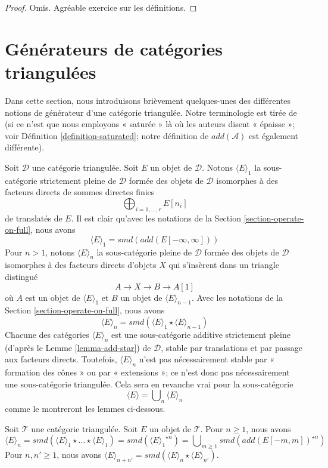 \begin{proof}
Omis. Agréable exercice sur les définitions.
\end{proof}

\section{Générateurs de catégories triangulées}
\label{section-generators}

\noindent
Dans cette section, nous introduisons brièvement quelques-unes des différentes
notions de générateur d'une catégorie triangulée. Notre terminologie est tirée
de \cite{BvdB} (si ce n'est que nous employons « saturée » là où les auteurs
disent « épaisse »; voir Définition \ref{definition-saturated}; notre définition
de $add(\mathcal{A})$ est également différente).

\medskip\noindent
Soit $\mathcal{D}$ une catégorie triangulée. Soit $E$ un objet de
$\mathcal{D}$. Notons $\langle E \rangle_1$ la sous-catégorie strictement
pleine de $\mathcal{D}$ formée des objets de $\mathcal{D}$ isomorphes à des
facteurs directs de sommes directes finies
$$
\bigoplus\nolimits_{i = 1, \ldots, r} E[n_i]
$$
de translatés de $E$. Il est clair qu'avec les notations de la
Section \ref{section-operate-on-full}, nous avons
$$
\langle E \rangle_1 = smd(add(E[-\infty, \infty]))
$$
Pour $n > 1$, notons $\langle E \rangle_n$ la sous-catégorie pleine de
$\mathcal{D}$ formée des objets de $\mathcal{D}$ isomorphes à des facteurs
directs d'objets $X$ qui s'insèrent dans un triangle distingué
$$
A \to X \to B \to A[1]
$$
où $A$ est un objet de $\langle E \rangle_1$ et $B$ un objet de
$\langle E \rangle_{n - 1}$. Avec les notations de la
Section \ref{section-operate-on-full}, nous avons
$$
\langle E \rangle_n = smd(\langle E \rangle_1 \star \langle E \rangle_{n - 1})
$$
Chacune des catégories $\langle E \rangle_n$ est une sous-catégorie additive
strictement pleine (d'après le Lemme \ref{lemma-add-star}) de $\mathcal{D}$,
stable par translations et par passage aux facteurs directs. Toutefois,
$\langle E \rangle_n$ n'est pas nécessairement stable par « formation des
cônes » ou par « extensions »; ce n'est donc pas nécessairement une
sous-catégorie triangulée. Cela sera en revanche vrai pour la sous-catégorie
$$
\langle E \rangle = \bigcup\nolimits_n \langle E \rangle_n
$$
comme le montreront les lemmes ci-dessous.

\begin{lemma}
\label{lemma-generated-by-E-explicit}
Soit $\mathcal{T}$ une catégorie triangulée. Soit $E$ un objet de
$\mathcal{T}$. Pour $n \geq 1$, nous avons
$$
\langle E \rangle_n =
smd(\langle E \rangle_1 \star \ldots \star \langle E \rangle_1) =
smd({\langle E \rangle_1}^{\star n}) =
\bigcup\nolimits_{m \geq 1} smd(add(E[-m, m])^{\star n})
$$
Pour $n, n' \geq 1$, nous avons $\langle E \rangle_{n + n'} =
smd(\langle E \rangle_n \star \langle E \rangle_{n'})$.
\end{lemma}

